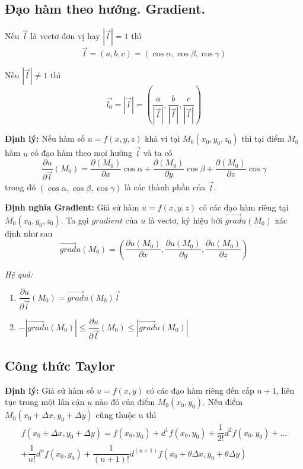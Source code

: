 \documentclass[12pt, a4paper]{article}
\begin{document}
	\subsection{Đạo hàm theo hướng. Gradient.}
	Nếu $ \vec{l} $  là vectơ đơn vị hay $ |\vec{l}| = 1 $ thì
	\[  \vec{l} = (a,b,c) = (\cos \alpha, \cos \beta, \cos \gamma) \]
	
	Nếu $ |\vec{l}| \ne 1 $ thì
	\[ \vec{l_0} = |\vec{l}| = (\dfrac{a}{|\vec{l}|},\dfrac{b}{|\vec{l}|}, \dfrac{c}{|\vec{l}|})  \]
	
	\textbf {Định lý:} Nếu hàm số $ u=f(x,y,z) $ khả vi tại $ M_0(x_0,y_0,z_0) $ thì tại điểm $ M_0 $ hàm $ u $ có đạo hàm theo mọi hướng $ \vec{l} $ và ta có
	\[ \dfrac {\partial u}{\partial \vec{l}}(M_0)=\dfrac {\partial (M_0)}{\partial x}\cos \alpha + \dfrac {\partial (M_0)}{\partial y}\cos \beta + \dfrac {\partial (M_0)}{\partial z}\cos \gamma \]
	trong đó $ (\cos \alpha, \cos \beta, \cos \gamma) $ là các thành phần của $ \vec{l} $.
	
	\medskip
	
	\textbf {Định nghĩa Gradient:} Giả sử hàm $ u=f(x, y, z) $ có các đạo hàm riêng tại $ M_0(x_0,y_0,z_0) $. Ta gọi $ gradient $ của $ u $ là vectơ, ký hiệu bởi $ \overrightarrow{grad}u(M_0) $ xác định như sau \[ \overrightarrow{grad}u(M_0) = (\dfrac {\partial u(M_0)}{\partial x}, \dfrac {\partial u(M_0)}{\partial y}, \dfrac {\partial u(M_0)}{\partial z})  \]
	
	\textit {Hệ quả:}
	\begin{enumerate}[label=\roman*)]
		\item $ \dfrac {\partial u}{\partial \vec{l}}(M_0)=\overrightarrow{grad}u(M_0)\vec{l} $
		\item $ -|\overrightarrow{grad}u(M_0)| \le \dfrac {\partial u}{\partial \vec{l}}(M_0) \le |\overrightarrow{grad}u(M_0)| $
	\end{enumerate}

	\subsection{Công thức Taylor}
	\textbf {Định lý:} Giả sử hàm số $ u=f(x,y) $ có các đạo hàm riêng đến cấp $ n+1 $, liên tục trong một lân cận $ u $ nào đó của điểm $ M_0(x_0,y_0) $. Nếu điểm $ M_0(x_0 + \Delta x,y_0 + \Delta y)  $ cũng thuộc u thì
	\begin{multline*} f(x_0 + \Delta x,y_0 + \Delta y) = f(x_0,y_0) + d^1f(x_0,y_0) + \dfrac{1}{2!}d^2f(x_0,y_0)+... \\ + \dfrac{1}{n!}d^nf(x_0,y_0) + \dfrac{1}{(n+1)!}d^{(n+1)}f(x_0 + \theta \Delta x ,y_0 + \theta \Delta y) \end{multline*}
\end{document}
